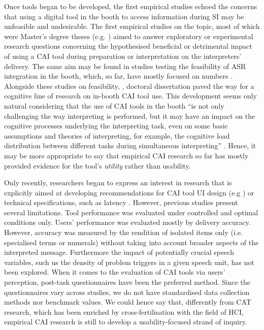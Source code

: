 Once tools began to be developed, the first empirical studies echoed the concerns that using a digital tool in the booth to access information during SI may be unfeasible and undesirable. The first empirical studies on the topic, most of which were Master’s degree theses (e.g. \cite{biagini2015glossario,de2013uso,gacek2015softwarelosungen,prandi2015a}) aimed to answer exploratory or experimental research questions concerning the hypothesised beneficial or detrimental impact of using a CAI tool during preparation or interpretation on the interpreters’ delivery. The same aim may be found in studies testing the feasibility of ASR integration in the booth, which, so far, have mostly focused on numbers \citep{canali2019technologie,defrancq2021automatic,desmet2018simultaneous,pisani2021measuring}. Alongside these studies on feasibility, \citet{prandi2018exploratory},  doctoral dissertation paved the way for a cognitive line of research on in-booth CAI tool use. This development seems only natural considering that the use of CAI tools in the booth ``is not only challenging the way interpreting is performed, but it may have an impact on the cognitive processes underlying the interpreting task, even on some basic assumptions and theories of interpreting, for example, the cognitive load distribution between different tasks during simultaneous interpreting'' \citep[153]{fantinuoli2018b}. Hence, it may be more appropriate to say that empirical CAI research so far has mostly provided evidence for the tool’s \textit{utility} rather than usability.

Only recently, researchers began to express an interest in research that is explicitly aimed at developing recommendations for CAI tool UI design (e.g \cite{eabm2021b}) or technical specifications, such as latency \citep{montecchio2021}. However, previous studies present several limitations. Tool performance was evaluated under controlled and optimal conditions only. Users’ performance was evaluated mostly by delivery accuracy. However, accuracy was measured by the rendition of isolated items only (i.e. specialised terms or numerals) without taking into account broader aspects of the interpreted message. Furthermore the impact of potentially crucial speech variables, such us the density of problem triggers in a given speech unit, has not been explored. When it comes to the evaluation of CAI tools via users’ perception, post-task questionnaires have been the preferred method. Since the questionnaires vary across studies, we do not have standardised data collection methods nor benchmark values. We could hence say that, differently from CAT research, which has been enriched by cross-fertilisation with the field of HCI, empirical CAI research is still to develop a usability-focused strand of inquiry.
